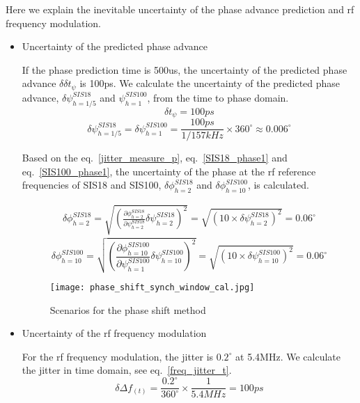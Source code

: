 Here we explain the inevitable uncertainty of the phase advance prediction and rf frequency modulation. 
\begin{itemize}
\item Uncertainty of the predicted phase advance

If the phase prediction time is 500us, the uncertainty of the predicted phase advance $\delta\delta t_\psi$ is 100ps. We calculate the uncertainty of the predicted phase advance, $\delta\psi_{h=1/5}^{SIS18}$ and $\psi_{h=1}^{SIS100}$, from the time to phase domain. 
\begin{equation} 
\delta t_\psi= 100ps
\label{jitter_measure_t}
\end{equation}
\begin{equation} 
\delta \psi_{h=1/5}^{SIS18}=\delta\psi_{h=1}^{SIS100}=
\frac {100ps}{1/157kHz} \times {360^{\circ}}\approx 0.006^\circ
\label{jitter_measure_p}
\end{equation}
 
Based on the eq.~\ref{jitter_measure_p}, eq.~\ref{SIS18_phase1} and eq.~\ref{SIS100_phase1}, the uncertainty of the phase at the rf reference frequencies of SIS18 and SIS100, $\delta \phi_{h=2}^{SIS18}$ and $\delta \phi_{h=10}^{SIS100}$, is calculated. 

\begin{equation}
\begin{aligned}
\delta \phi_{h=2}^{SIS18} = \sqrt {(\frac{\partial \phi_{h=2}^{SIS18}}{\partial \psi_{h=2}^{SIS18}} \delta \psi_{h=2}^{SIS18})^2}=\sqrt {(10 \times \delta \psi_{h=2}^{SIS18})^2}=0.06^\circ
\label{phi_jitter1}
\end{aligned}
\end{equation}
\begin{equation}
\delta \phi_{h=10}^{SIS100} = \sqrt {(\frac{\partial \phi_{h=10}^{SIS100}}{\partial \psi_{h=1}^{SIS100}} \delta \psi_{h=10}^{SIS100})^2}=\sqrt {(10 \times \delta \psi_{h=10}^{SIS100})^2}=0.06^\circ
\label{phi_jitter2}
\end{equation}


\begin{figure}[!htb]
   \centering   
   \texttt{[image: phase\_shift\_synch\_window\_cal.jpg]}
   \caption{Scenarios for the phase shift method}
   \label{phase_shift}
\end{figure}
\item Uncertainty of the rf frequency modulation

For the rf frequency modulation, the jitter is $0.2^\circ$ at 5.4MHz. We calculate the jitter in time domain, see eq.~\ref{freq_jitter_t}.
\begin{equation}
\delta \Delta f_{(t)} = \frac{0.2^\circ}{360^\circ} \times {\frac{1}{5.4MHz}}=100ps
\label{freq_jitter_t}
\end{equation}
%



\end{itemize}
